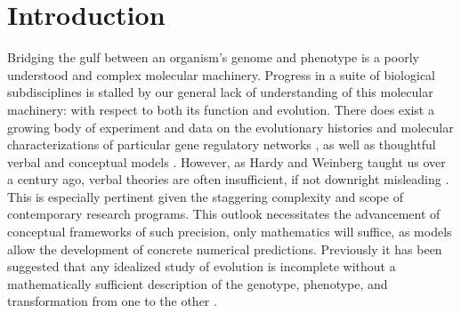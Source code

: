 \documentclass[9 pt]{article}
\newcommand{\1}{\mathbbm{1}}
\begin{document}
\section*{Introduction}

Bridging the gulf between an organism's genome and phenotype is a poorly understood and complex molecular machinery. Progress in a suite of biological subdisciplines is stalled by our general lack of understanding of this molecular machinery: with respect to both its function and evolution. There does exist a growing body of experiment and data on the evolutionary histories and molecular characterizations of particular gene regulatory networks \citep{jaeger2011gap, davidson2006gene, israel2016comparative}, as well as thoughtful verbal and conceptual models \citep{true2001developmental, gwagner1, weiss2000phenogenetic, edelman2001degeneracy}. However, as Hardy and Weinberg taught us over a century ago, verbal theories are often insufficient, if not downright misleading \citep{hardy1908mendelian, weinberg1908vererbungsgesetze, servedio2014not}. This is especially pertinent given the staggering complexity and scope of contemporary research programs. This outlook necessitates the advancement of conceptual frameworks of such precision, only mathematics will suffice, as models allow the development of concrete numerical predictions. Previously it has been suggested that any idealized study of evolution is incomplete without a mathematically sufficient description of the genotype, phenotype, and transformation from one to the other \citep{Lewontin1974genetic}.%

\end{document}
